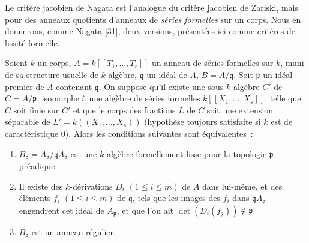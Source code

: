 \begin{env}[22.7.1]
\label{0.22.7.1-fr}
Le critère jacobien de Nagata est l'analogue du critère jacobien de Zariski,
mais pour des anneaux quotients d'anneaux de \emph{séries formelles} sur un
corps. Nous en donnerons, comme Nagata [31], deux versions, présentées ici
comme critères de lissité formelle.
\end{env}

\begin{proposition}[22.7.2]
\label{0.22.7.2-fr}
Soient $k$ un corps, $A=k[[T_1,\ldots,T_r]]$ un anneau de séries formelles sur
$k$, muni de sa structure usuelle de $k$-algèbre, $\mathfrak q$ un idéal de
$A$, $B=A/\mathfrak q$. Soit $\mathfrak p$ un idéal premier de $A$ contenant
$\mathfrak q$. On suppose qu'il existe une sous-$k$-algèbre $C'$ de
$C=A/\mathfrak p$, isomorphe à une algèbre de séries formelles
$k[[X_1,\ldots,X_s]]$, telle que $C$ soit finie sur $C'$ et que le corps des
fractions $L$ de $C$ soit une extension séparable de
$L'=k((X_1,\ldots,X_s))$ (hypothèse toujours satisfaite si $k$ est de
caractéristique 0). Alors les conditions suivantes sont équivalentes~:
\begin{enumerate}
  \item[a)] $B_{\mathfrak p}=A_{\mathfrak p}/\mathfrak qA_{\mathfrak p}$ est
  une $k$-algèbre formellement lisse pour la topologie
  $\mathfrak p$-préadique.
  \item[b)] Il existe des $k$-dérivations $D_i$ $(1\leq i\leq m)$ de $A$ dans
  lui-même, et des éléments $f_i$ $(1\leq i\leq m)$ de $\mathfrak q$, tels
  que les images des $f_i$ dans $\mathfrak qA_{\mathfrak p}$ engendrent cet
  idéal de $A_{\mathfrak p}$, et que l'on ait
  $\det(D_i(f_j))\notin\mathfrak p$.
  \item[c)] $B_{\mathfrak p}$ est un anneau régulier.
\end{enumerate}
\end{proposition}

